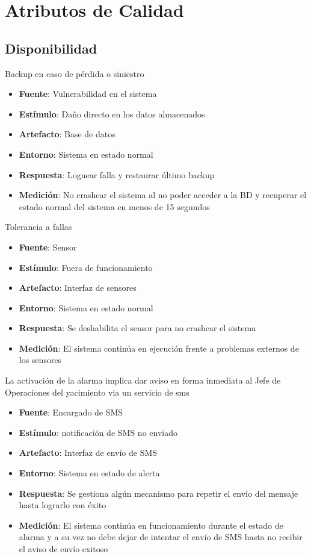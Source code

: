 \section{Atributos de Calidad}

\subsection{Disponibilidad}

Backup en caso de pérdida o siniestro
\begin{itemize}
\item {\bf Fuente}: Vulnerabilidad en el sistema
\item {\bf Estímulo}: Daño directo en los datos almacenados
\item {\bf Artefacto}: Base de datos
\item {\bf Entorno}: Sistema en estado normal
\item {\bf Respuesta}: Loguear falla y restaurar último backup
\item {\bf Medición}: No crashear el sistema al no poder acceder a la BD y recuperar el estado normal del sistema en menos de 15 segundos 
\end{itemize}

Tolerancia a fallas
\begin{itemize}
\item {\bf Fuente}: Sensor
\item {\bf Estímulo}: Fuera de funcionamiento
\item {\bf Artefacto}: Interfaz de sensores
\item {\bf Entorno}: Sistema en estado normal
\item {\bf Respuesta}: Se deshabilita el sensor para no crashear el sistema
\item {\bf Medición}: El sistema continúa en ejecución frente a problemas externos de los sensores
\end{itemize}

La activación de la alarma implica dar aviso en forma inmediata al Jefe de Operaciones del yacimiento via un servicio de sms
\begin{itemize}
\item {\bf Fuente}: Encargado de SMS
\item {\bf Estímulo}: notificación de SMS no enviado
\item {\bf Artefacto}: Interfaz de envío de SMS
\item {\bf Entorno}: Sistema en estado de alerta
\item {\bf Respuesta}: Se gestiona algún mecanismo para repetir el envío del mensaje hasta lograrlo con éxito
\item {\bf Medición}: El sistema continúa en funcionamiento durante el estado de alarma y a su vez no debe dejar de intentar el envío de SMS hasta no recibir el aviso de envío exitoso
\end{itemize}

